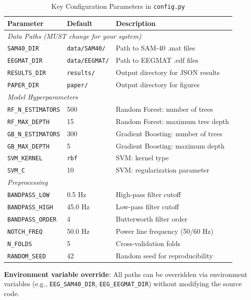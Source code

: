\documentclass[11pt,a4paper]{article}
\begin{document}
\begin{table}[H]
\centering
\caption{Key Configuration Parameters in \texttt{config.py}}
\small
\begin{tabular}{p{4cm}p{3cm}p{6cm}}
\toprule
\textbf{Parameter} & \textbf{Default} & \textbf{Description} \\
\midrule
\multicolumn{3}{l}{\textit{Data Paths (MUST change for your system)}} \\
\texttt{SAM40\_DIR} & \texttt{data/SAM40/} & Path to SAM-40 .mat files \\
\texttt{EEGMAT\_DIR} & \texttt{data/EEGMAT/} & Path to EEGMAT .edf files \\
\texttt{RESULTS\_DIR} & \texttt{results/} & Output directory for JSON results \\
\texttt{PAPER\_DIR} & \texttt{paper/} & Output directory for figures \\
\midrule
\multicolumn{3}{l}{\textit{Model Hyperparameters}} \\
\texttt{RF\_N\_ESTIMATORS} & 500 & Random Forest: number of trees \\
\texttt{RF\_MAX\_DEPTH} & 15 & Random Forest: maximum tree depth \\
\texttt{GB\_N\_ESTIMATORS} & 300 & Gradient Boosting: number of trees \\
\texttt{GB\_MAX\_DEPTH} & 5 & Gradient Boosting: maximum depth \\
\texttt{SVM\_KERNEL} & \texttt{rbf} & SVM: kernel type \\
\texttt{SVM\_C} & 10 & SVM: regularization parameter \\
\midrule
\multicolumn{3}{l}{\textit{Preprocessing}} \\
\texttt{BANDPASS\_LOW} & 0.5 Hz & High-pass filter cutoff \\
\texttt{BANDPASS\_HIGH} & 45.0 Hz & Low-pass filter cutoff \\
\texttt{BANDPASS\_ORDER} & 4 & Butterworth filter order \\
\texttt{NOTCH\_FREQ} & 50.0 Hz & Power line frequency (50/60 Hz) \\
\texttt{N\_FOLDS} & 5 & Cross-validation folds \\
\texttt{RANDOM\_SEED} & 42 & Random seed for reproducibility \\
\bottomrule
\end{tabular}
\end{table}

\noindent\textbf{Environment variable override}: All paths can be overridden via environment variables (e.g., \texttt{EEG\_SAM40\_DIR}, \texttt{EEG\_EEGMAT\_DIR}) without modifying the source code.
\end{document}
